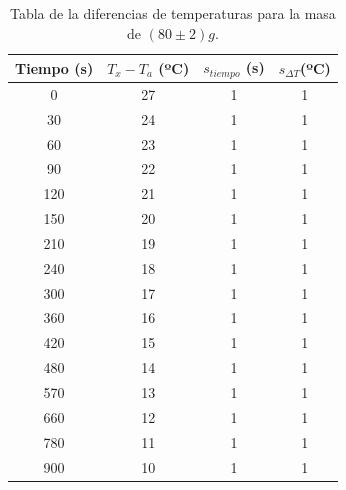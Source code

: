 \documentclass[a4paper]{article}
\begin{document}
\begin{table}[H]
  \centering
    \begin{tabular}{|c|c|c|c|} \hline
    Tiempo (s) & $T_x - T_a$ (ºC) & $s_{tiempo }$ (s) &  $s_{ \Delta T} $(ºC) \\ \hline
    0     & 27    & 1     & 1 \\ \hline
    30    & 24    & 1     & 1 \\ \hline
    60    & 23    & 1     & 1 \\ \hline
    90    & 22    & 1     & 1 \\ \hline
    120   & 21    & 1     & 1 \\ \hline
    150   & 20    & 1     & 1 \\ \hline
    210   & 19    & 1     & 1 \\ \hline
    240   & 18    & 1     & 1 \\ \hline
    300   & 17    & 1     & 1 \\ \hline
    360   & 16    & 1     & 1 \\ \hline
    420   & 15    & 1     & 1 \\ \hline
    480   & 14    & 1     & 1 \\ \hline
    570   & 13    & 1     & 1 \\ \hline
    660   & 12    & 1     & 1 \\ \hline
    780   & 11    & 1     & 1 \\ \hline
    900   & 10    & 1     & 1 \\ \hline
    \end{tabular}%
  \caption{Tabla de la diferencias de temperaturas para la masa de $(80\pm 2)g$.}
\end{table}%
\end{document}
